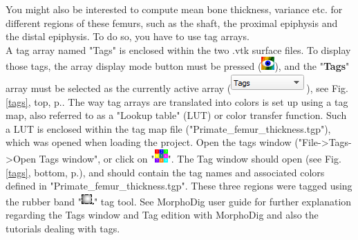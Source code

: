 \documentclass[12pt, a4paper]{book}
\begin{document}
You might also be interested to compute mean bone thickness, variance etc. for different regions of these femurs, such as the shaft, the proximal epiphysis and the distal epiphysis. To do so, you have to use tag arrays.\\

A tag array named "Tags" is enclosed within the two .vtk surface files. To display those tags, the array display mode button must be pressed (\includegraphics[scale=0.7]{../images/04/show_color_scale.png}), and the "\textbf{Tags}" array must be selected as the currently active array (\includegraphics[scale=0.5]{scalarcombo_tag.png}), see  Fig. \ref{tags}, top, p.\pageref{tags}. The way tag arrays are translated into colors is set up using a tag map, also referred to as a "Lookup table" (LUT) or color transfer function. Such a LUT is enclosed within the tag map file ("Primate\_femur\_thickness.tgp"), which was opened when loading the project.  Open the tags window ("File->Tags->Open Tags window", or click on "\includegraphics[scale=0.7]{../images/04/tag_edit.png}". The Tag window should open (see Fig. \ref{tags}, bottom, p.\pageref{tags}), and should contain the tag names and associated colors defined in "Primate\_femur\_thickness.tgp". These three regions were tagged using the rubber band "\includegraphics[scale=0.7]{../images/12/rubber_band.png}" tag tool. See MorphoDig user guide for further explanation regarding the Tags window and Tag edition with MorphoDig and also the tutorials dealing with tags.\\
\end{document}
